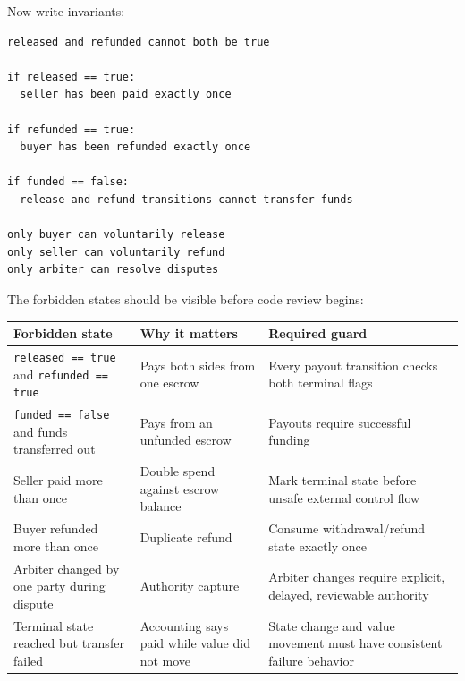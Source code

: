 Now write invariants:

\begin{lstlisting}
released and refunded cannot both be true

if released == true:
  seller has been paid exactly once

if refunded == true:
  buyer has been refunded exactly once

if funded == false:
  release and refund transitions cannot transfer funds

only buyer can voluntarily release
only seller can voluntarily refund
only arbiter can resolve disputes
\end{lstlisting}

The forbidden states should be visible before code review begins:

{\def\LTcaptype{none} %
\begin{longtable}[]{@{}
  >{\raggedright\arraybackslash}p{}
  >{\raggedright\arraybackslash}p{}
  >{\raggedright\arraybackslash}p{}@{}}
\toprule\noalign{}
\begin{minipage}[b]{\linewidth}\raggedright
Forbidden state
\end{minipage} & \begin{minipage}[b]{\linewidth}\raggedright
Why it matters
\end{minipage} & \begin{minipage}[b]{\linewidth}\raggedright
Required guard
\end{minipage} \\
\midrule\noalign{}
\endhead
\bottomrule\noalign{}
\endlastfoot
\passthrough{\lstinline!released == true!} and
\passthrough{\lstinline!refunded == true!} & Pays both sides from one
escrow & Every payout transition checks both terminal flags \\
\passthrough{\lstinline!funded == false!} and funds transferred out &
Pays from an unfunded escrow & Payouts require successful funding \\
Seller paid more than once & Double spend against escrow balance & Mark
terminal state before unsafe external control flow \\
Buyer refunded more than once & Duplicate refund & Consume
withdrawal/refund state exactly once \\
Arbiter changed by one party during dispute & Authority capture &
Arbiter changes require explicit, delayed, reviewable authority \\
Terminal state reached but transfer failed & Accounting says paid while
value did not move & State change and value movement must have
consistent failure behavior \\
\end{longtable}
}

